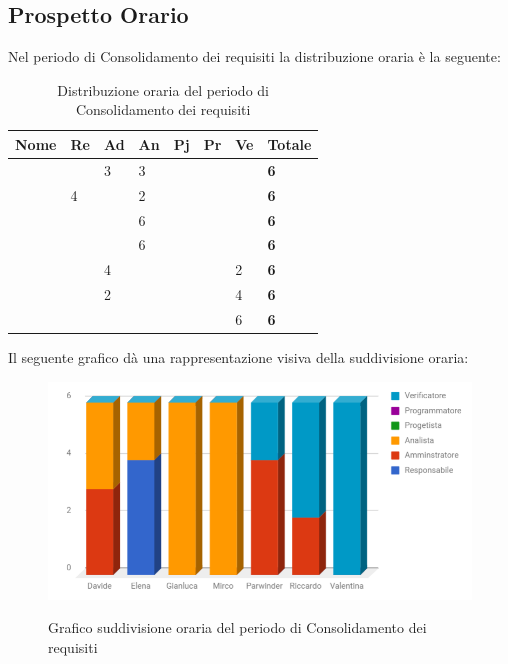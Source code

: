 \documentclass[PianoDiProgetto.tex]{subfiles}
\begin{document}
\subsection{Prospetto Orario}
Nel periodo di Consolidamento dei requisiti la distribuzione oraria è la seguente:
\begin{center}

\begin{table}[htbp]
	\centering
	\renewcommand\arraystretch{1.5}
	\begin{tabularx}{\textwidth}{p{4cm}|p{1cm}|p{1cm}|p{1cm}|p{1cm}|p{1cm}|p{1cm}|p{2cm}}
		\hline
		\textbf{Nome} & \textbf{Re} & \textbf{Ad} & \textbf{An} & \textbf{Pj} & \textbf{Pr} & \textbf{Ve} & \textbf{Totale} \\
		\hline
		\Davide & \ & 3 & 3 & \ & \ & \ & \textbf{6} \\
		\hline
		\Elena & 4 & \ & 2 & \ & \ & \ & \textbf{6} \\
		\hline
		\Gianluca & \ & \ & 6 & \ & \ & \ & \textbf{6} \\
		\hline
		\Mirco & \ & \ & 6 & \ & \ & \ & \textbf{6} \\
		\hline
		\Parwinder & \ & 4 & \ & \ & \ & 2 & \textbf{6} \\
		\hline
		\Riccardo & \ & 2 & \ & \ & \ & 4 & \textbf{6} \\
		\hline
		\Valentina & \ & \ & \ & \ & \ & 6 & \textbf{6} \\
		\hline
	\end{tabularx}
	\caption{Distribuzione oraria del periodo di Consolidamento dei requisiti}
	\label{my-label}
\end{table}
\end{center}
\newpage
Il seguente grafico dà una rappresentazione visiva della suddivisione oraria:

\begin{figure}[h]
	\centering
	\includegraphics[width=14.5cm]{images/prospettoOrario/consolidamento.png}
	\label{fig:foo}
	\caption{Grafico suddivisione oraria del periodo di Consolidamento dei requisiti}
\end{figure} 
\end{document}
